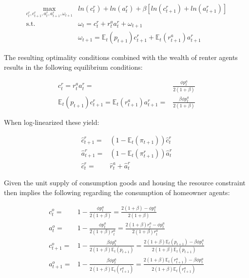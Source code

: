 \documentclass{article}
\begin{document}
\begin{align}
    \underset{c^r_t, c^r_{t+1}, a^r_{t}, a^r_{t+1}, \omega_{t+1}}{\max} &ln(c^r_t) + ln(a^r_t) + \beta[ln(c^r_{t+1}) + ln(a^r_{t+1})] \nonumber \\
    \text{s.t. }& \omega_t = c^r_t + r_t^a a^r_t + \omega_{t+1} \nonumber \\
    & \omega_{t+1} = \mathbb{E}_t(p_{t+1})c^r_{t+1} + \mathbb{E}_t(r^a_{t+1})a^r_{t+1}
\end{align}

The resulting optimality conditions combined with the wealth of renter agents results in the following equilibrium conditions:

\begin{align}
    c^r_t = r^a_t a^r_t =& \frac{\phi p^a_t}{2(1+\beta)} \\
    \mathbb{E}_t(p_{t+1}) c^r_{t+1} = \mathbb{E}_t(r^a_{t+1}) a^r_{t+1} =& \frac{\beta \phi p^a_t}{2(1+\beta)}
\end{align}

When log-linearized these yield:

\begin{align}
    \hat{c}^r_{t+1} =& (1-\mathbb{E}_t(\pi_{t+1}))\hat{c}^r_t \\
    \hat{a}^r_{t+1} =& (1-\mathbb{E}_t(\pi^r_{t+1}))\hat{a}^r_t \\
    \hat{c}^r_t =& \hat{r}^a_t + \hat{a}^r_t
\end{align}

Given the unit supply of consumption goods and housing the resource constraint then implies the following regarding the consumption of homeowner agents:

\begin{align}
    c^o_t =& 1 - \frac{\phi p^a_t}{2(1+\beta)} = \frac{2(1+\beta) - \phi p^a_t}{2(1+\beta)} \\
    a^o_t =& 1 - \frac{\phi p^a_t}{2(1+\beta)r^a_t} = \frac{2(1+\beta)r^a_t - \phi p^a_t}{2(1+\beta)r^a_t} \\
    c^o_{t+1}  =& 1 - \frac{\beta \phi p^a_t}{2(1+\beta)\mathbb{E}_t(p_{t+1})} = \frac{2(1+\beta)\mathbb{E}_t(p_{t+1}) - \beta \phi p^a_t}{2(1+\beta)\mathbb{E}_t(p_{t+1})} \\
    a^o_{t+1}  =& 1 - \frac{\beta \phi p^a_t}{2(1+\beta)\mathbb{E}_t(r^a_{t+1})} = \frac{2(1+\beta)\mathbb{E}_t(r^a_{t+1}) - \beta \phi p^a_t}{2(1+\beta)\mathbb{E}_t(r^a_{t+1})} \\
\end{align}
\end{document}

